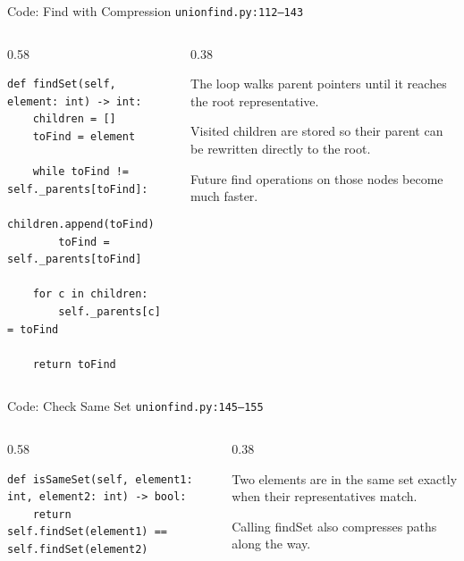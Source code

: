 \documentclass[aspectratio=169,11pt]{beamer}
\begin{document}
\begin{frame}[fragile]{Code: Find with Compression}
\scriptsize
{} \texttt{unionfind.py:112--143}

\vspace{0.08cm}
\begin{columns}[T,totalwidth=\textwidth]
\begin{column}{0.58\textwidth}
\begin{lstlisting}[style=cpcode]
def findSet(self, element: int) -> int:
    children = []
    toFind = element

    while toFind != self._parents[toFind]:
        children.append(toFind)
        toFind = self._parents[toFind]

    for c in children:
        self._parents[c] = toFind

    return toFind
\end{lstlisting}
\end{column}
\begin{column}{0.38\textwidth}
\begin{tightitemize}
  \item The loop walks parent pointers until it reaches the root representative.
  \item Visited children are stored so their parent can be rewritten directly to the root.
  \item Future find operations on those nodes become much faster.
\end{tightitemize}
\end{column}
\end{columns}
\end{frame}

\begin{frame}[fragile]{Code: Check Same Set}
\scriptsize
{} \texttt{unionfind.py:145--155}

\vspace{0.08cm}
\begin{columns}[T,totalwidth=\textwidth]
\begin{column}{0.58\textwidth}
\begin{lstlisting}[style=cpcode]
def isSameSet(self, element1: int, element2: int) -> bool:
    return self.findSet(element1) == self.findSet(element2)
\end{lstlisting}
\end{column}
\begin{column}{0.38\textwidth}
\begin{tightitemize}
  \item Two elements are in the same set exactly when their representatives match.
  \item Calling findSet also compresses paths along the way.
\end{tightitemize}
\end{column}
\end{columns}
\end{frame}
\end{document}
